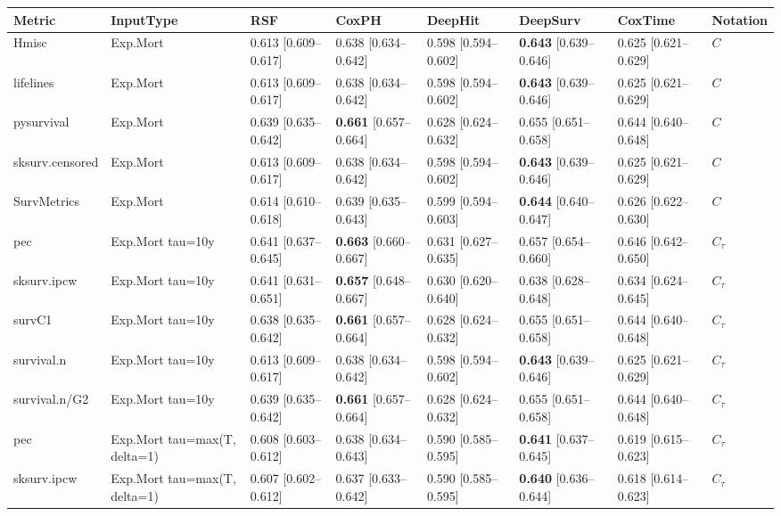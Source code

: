 
\begin{tabular}{llllllll}
\toprule
Metric & InputType & RSF & CoxPH & DeepHit & DeepSurv & CoxTime & Notation\\
\midrule
Hmisc & Exp.Mort & 0.613 [0.609–0.617] & 0.638 [0.634–0.642] & 0.598 [0.594–0.602] & \textbf{0.643} [0.639–0.646] & 0.625 [0.621–0.629] & $C$\\
lifelines & Exp.Mort & 0.613 [0.609–0.617] & 0.638 [0.634–0.642] & 0.598 [0.594–0.602] & \textbf{0.643} [0.639–0.646] & 0.625 [0.621–0.629] & $C$\\
pysurvival & Exp.Mort & 0.639 [0.635–0.642] & \textbf{0.661} [0.657–0.664] & 0.628 [0.624–0.632] & 0.655 [0.651–0.658] & 0.644 [0.640–0.648] & $C$\\
sksurv.censored & Exp.Mort & 0.613 [0.609–0.617] & 0.638 [0.634–0.642] & 0.598 [0.594–0.602] & \textbf{0.643} [0.639–0.646] & 0.625 [0.621–0.629] & $C$\\
SurvMetrics & Exp.Mort & 0.614 [0.610–0.618] & 0.639 [0.635–0.643] & 0.599 [0.594–0.603] & \textbf{0.644} [0.640–0.647] & 0.626 [0.622–0.630] & $C$\\
\addlinespace
pec & Exp.Mort tau=10y & 0.641 [0.637–0.645] & \textbf{0.663} [0.660–0.667] & 0.631 [0.627–0.635] & 0.657 [0.654–0.660] & 0.646 [0.642–0.650] & $C_{\tau}$\\
sksurv.ipcw & Exp.Mort tau=10y & 0.641 [0.631–0.651] & \textbf{0.657} [0.648–0.667] & 0.630 [0.620–0.640] & 0.638 [0.628–0.648] & 0.634 [0.624–0.645] & $C_{\tau}$\\
survC1 & Exp.Mort tau=10y & 0.638 [0.635–0.642] & \textbf{0.661} [0.657–0.664] & 0.628 [0.624–0.632] & 0.655 [0.651–0.658] & 0.644 [0.640–0.648] & $C_{\tau}$\\
survival.n & Exp.Mort tau=10y & 0.613 [0.609–0.617] & 0.638 [0.634–0.642] & 0.598 [0.594–0.602] & \textbf{0.643} [0.639–0.646] & 0.625 [0.621–0.629] & $C_{\tau}$\\
survival.n/G2 & Exp.Mort tau=10y & 0.639 [0.635–0.642] & \textbf{0.661} [0.657–0.664] & 0.628 [0.624–0.632] & 0.655 [0.651–0.658] & 0.644 [0.640–0.648] & $C_{\tau}$\\
\addlinespace
pec & Exp.Mort tau=max(T, delta=1) & 0.608 [0.603–0.612] & 0.638 [0.634–0.643] & 0.590 [0.585–0.595] & \textbf{0.641} [0.637–0.645] & 0.619 [0.615–0.623] & $C_{\tau}$\\
sksurv.ipcw & Exp.Mort tau=max(T, delta=1) & 0.607 [0.602–0.612] & 0.637 [0.633–0.642] & 0.590 [0.585–0.595] & \textbf{0.640} [0.636–0.644] & 0.618 [0.614–0.623] & $C_{\tau}$\\

\end{tabular}
